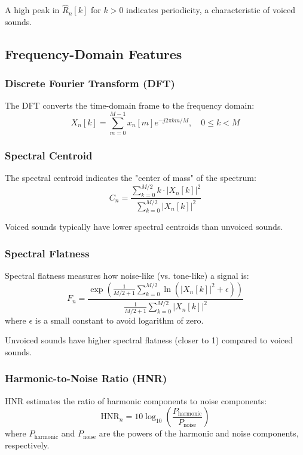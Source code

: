 \documentclass[10pt,journal,compsoc]{IEEEtran}
\begin{document}
A high peak in $\hat{R}_n[k]$ for $k > 0$ indicates periodicity, a characteristic of voiced sounds.

\subsection{Frequency-Domain Features}

\subsubsection{Discrete Fourier Transform (DFT)}
The DFT converts the time-domain frame to the frequency domain:
\begin{equation}
X_n[k] = \sum_{m=0}^{M-1} x_n[m] e^{-j2\pi km/M}, \quad 0 \leq k < M
\end{equation}

\subsubsection{Spectral Centroid}
The spectral centroid indicates the "center of mass" of the spectrum:
\begin{equation}
C_n = \frac{\sum_{k=0}^{M/2} k \cdot |X_n[k]|^2}{\sum_{k=0}^{M/2} |X_n[k]|^2}
\end{equation}

Voiced sounds typically have lower spectral centroids than unvoiced sounds.

\subsubsection{Spectral Flatness}
Spectral flatness measures how noise-like (vs. tone-like) a signal is:
\begin{equation}
F_n = \frac{\exp\left(\frac{1}{M/2+1} \sum_{k=0}^{M/2} \ln(|X_n[k]|^2 + \epsilon)\right)}{\frac{1}{M/2+1} \sum_{k=0}^{M/2} |X_n[k]|^2}
\end{equation}
where $\epsilon$ is a small constant to avoid logarithm of zero.

Unvoiced sounds have higher spectral flatness (closer to 1) compared to voiced sounds.

\subsubsection{Harmonic-to-Noise Ratio (HNR)}
HNR estimates the ratio of harmonic components to noise components:
\begin{equation}
\text{HNR}_n = 10 \log_{10}\left(\frac{P_{\text{harmonic}}}{P_{\text{noise}}}\right)
\end{equation}
where $P_{\text{harmonic}}$ and $P_{\text{noise}}$ are the powers of the harmonic and noise components, respectively.
\end{document}

